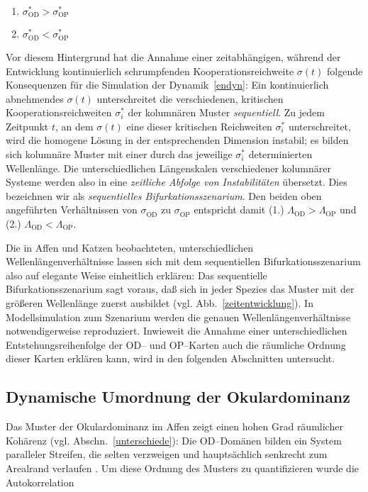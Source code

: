 \begin{enumerate}
    \item $\sigma_{\text{OD}}^\ast > \sigma_{\text{OP}}^\ast$
    \item $\sigma_{\text{OD}}^\ast < \sigma_{\text{OP}}^\ast$
\end{enumerate}

Vor diesem Hintergrund hat die Annahme einer zeitabhängigen, während der
Entwicklung kontinuierlich schrumpfenden Kooperationsreichweite $\sigma(t)$
folgende Konsequenzen für die Simulation der Dynamik~\eqref{endyn}: Ein
kontinuierlich abnehmendes $\sigma(t)$ unterschreitet die verschiedenen,
kritischen Kooperationsreichweiten $\sigma_i^\ast$ der
kolumnären Muster \emph{sequentiell}. Zu jedem Zeitpunkt $t$, an dem
$\sigma(t)$ eine dieser kritischen Reichweiten $\sigma_i^\ast$
unterschreitet, wird die homogene Lösung in der entsprechenden Dimension
instabil; es bilden sich kolumnäre Muster mit einer durch das jeweilige
$\sigma_i^\ast$ determinierten Wellenlänge. Die unterschiedlichen
Längenskalen verschiedener kolumnärer Systeme werden also in eine
\emph{zeitliche Abfolge von Instabilitäten} übersetzt. Dies bezeichnen
wir als \emph{sequentielles Bifurkationsszenarium}. Den beiden oben
angeführten Verhältnissen von $\sigma_{\text{OD}}^{\phantom{\ast}}$ zu
$\sigma_{\text{OP}}^{\phantom{\ast}}$ entspricht damit (1.)
$\Lambda_{\text{OD}} > \Lambda_{\text{OP}}$ und (2.) $\Lambda_{\text{OD}} <
\Lambda_{\text{OP}}$.

Die in Affen und Katzen beobachteten, unterschiedlichen
Wellenlängenverhältnisse lassen sich mit dem sequentiellen
Bifurkationsszenarium also auf elegante Weise einheitlich erklären: Das
sequentielle Bifurkationsszenarium sagt voraus, daß sich in jeder Spezies
das Muster mit der größeren Wellenlänge zuerst ausbildet
(vgl. Abb.~\ref{zeitentwicklung}). In Modellsimulation zum Szenarium
werden die genauen Wellenlängenverhältnisse notwendigerweise
reproduziert. Inwieweit die Annahme einer unterschiedlichen
Entstehungsreihenfolge der OD-- und OP--Karten auch die räumliche Ordnung
dieser Karten erklären kann, wird in den folgenden Abschnitten untersucht.

\subsection{Dynamische Umordnung der Okulardominanz}
\label{odord}

Das Muster der Okulardominanz im Affen zeigt einen hohen Grad räumlicher
Kohärenz (vgl. Abschn.~\ref{unterschiede}): Die OD--Domänen bilden ein
System paralleler Streifen, die selten verzweigen und hauptsächlich
senkrecht zum Arealrand verlaufen \parencite[siehe z.B.][]{levayetal:1985}.
Um diese Ordnung des Musters zu quantifizieren wurde die
Autokorrelation

